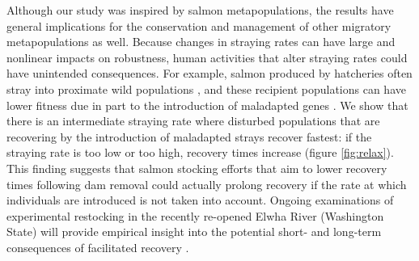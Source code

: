 \documentclass{revtex4}
\begin{document}


Although our study was inspired by salmon metapopulations, the results have general implications for the conservation and management of other migratory metapopulations as well. 
Because changes in straying rates can have large and nonlinear impacts on robustness, human activities that alter straying rates could have unintended consequences. 
For example, salmon produced by hatcheries often stray into proximate wild populations \citep{Brenner:2012gl}, and these recipient populations can have lower fitness due in part to the introduction of maladapted genes \citep{Ford:2002ip}. 
We show that there is an intermediate straying rate where disturbed populations that are recovering by the introduction of maladapted strays recover fastest: if the straying rate is too low or too high, recovery times increase (figure \ref{fig:relax}).
This finding suggests that salmon stocking efforts that aim to lower recovery times following dam removal could actually prolong recovery if the rate at which individuals are introduced is not taken into account.
Ongoing examinations of experimental restocking in the recently re-opened Elwha River (Washington State) will provide empirical insight into the potential short- and long-term consequences of facilitated recovery \citep{Liermann:2017gj}. 
\end{document}
